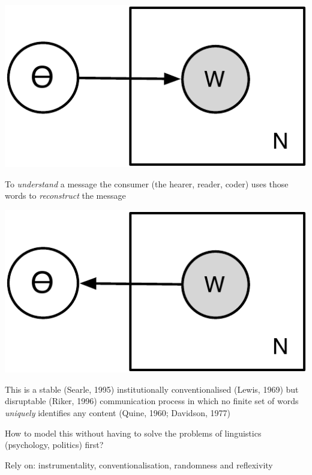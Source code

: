 \documentclass{mediumfoils}
\begin{document}
\begin{center}
\includegraphics[scale=.9]{pictures/gen-plate}
\end{center}



To \textsl{understand} a message the consumer (the hearer, reader, coder) uses those words to \textsl{reconstruct} the message

\begin{center}
\includegraphics[scale=.9]{pictures/inf-plate}
\end{center}




This is a stable (Searle, 1995) institutionally conventionalised (Lewis, 1969) but disruptable (Riker, 1996) communication process
in which no finite set of words \textsl{uniquely} identifies any content (Quine, 1960; Davidson, 1977)

How to model this without having to solve the problems of linguistics (psychology, politics) first?

Rely on: instrumentality, conventionalisation, randomness and reflexivity
\end{document}
